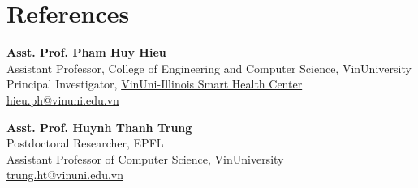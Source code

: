 \documentclass[a4paper,10pt]{article}
\begin{document}
\section{References}
\begin{minipage}[t]{0.48\textwidth}
  \textbf{Asst. Prof. Pham Huy Hieu}\\
  Assistant Professor, College of Engineering and Computer Science, VinUniversity\\
  Principal Investigator, \href{https://smarthealth.vinuni.edu.vn/}{VinUni-Illinois Smart Health Center}\\
  \href{mailto:hieu.ph@vinuni.edu.vn}{hieu.ph@vinuni.edu.vn}
\end{minipage}
\hfill
\begin{minipage}[t]{0.48\textwidth}
  \textbf{Asst. Prof. Huynh Thanh Trung}\\
  Postdoctoral Researcher, EPFL\\
  Assistant Professor of Computer Science, VinUniversity\\
  \href{mailto:trung.ht@vinuni.edu.vn}{trung.ht@vinuni.edu.vn}
\end{minipage}
\end{document}
